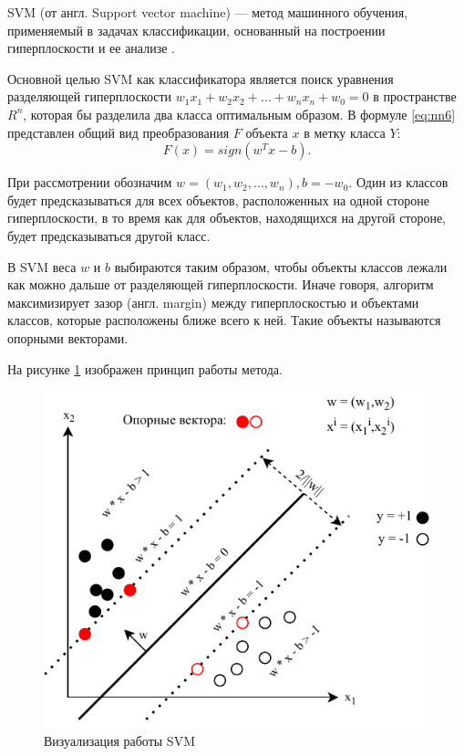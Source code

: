 SVM (от англ. Support vector machine) --- метод машинного обучения, применяемый в задачах классификации, основанный на построении гиперплоскости и ее анализе \cite{svm}.


Основной целью SVM как классификатора является поиск уравнения разделяющей гиперплоскости $w_1x_1+w_2x_2+…+w_nx_n+w_0=0$ в пространстве $R^n$, которая бы разделила два класса оптимальным образом. В формуле \ref{eq:nn6} представлен общий вид преобразования $F$ объекта $x$ в метку класса $Y$: 
\begin{equation}
	\label{eq:nn6}
	F(x) = sign(w^Tx-b).
\end{equation}

При рассмотрении обозначим $w = (w_1, w_2, …, w_n), b=-w_0$. Один из классов будет предсказываться для всех объектов, расположенных на одной стороне гиперплоскости, в то время как для объектов, находящихся на другой стороне, будет предсказываться другой класс.

В SVM веса $w$ и $b$ выбираются таким образом, чтобы объекты классов лежали как можно дальше от разделяющей гиперплоскости. 
Иначе говоря, алгоритм максимизирует зазор (англ. margin) между гиперплоскостью и объектами классов, которые расположены ближе всего к ней. Такие объекты называются опорными векторами.


На рисунке \ref{fig:svm1} изображен принцип работы метода.

\begin{figure}[H]
	\centering
	\includegraphics[width=\textwidth]{../img/svm1.pdf}
	\caption{Визуализация работы SVM}
	\label{fig:svm1}
\end{figure}

